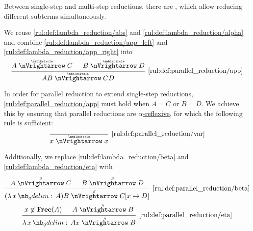 \begin{definition}\label{def:parallel_reduction}
  Between single-step and multi-step reductions, there are , which allow reducing different subterms simultaneously.

  \begin{thmenum}
     We reuse \ref{rul:def:lambda_reduction/abs} and \ref{rul:def:lambda_reduction/alpha} and combine \ref{rul:def:lambda_reduction/app_left} and \ref{rul:def:lambda_reduction/app_right} into
    \begin{equation*}\taglabel[\ensuremath{ \logic{ParApp}_{\anon} }]{rul:def:parallel_reduction/app}
      \begin{prooftree}
        \hypo{ A \ppred C }
        \hypo{ B \ppred D }
        \infer2[\ref{rul:def:parallel_reduction/app}]{ AB \ppred CD }
      \end{prooftree}
    \end{equation*}

     In order for parallel reduction to extend single-step reductions, \ref{rul:def:parallel_reduction/app} must hold when \( A = C \) or \( B = D \). We achieve this by ensuring that parallel reductions are \hyperref[def:alpha_reflexive]{\( \alpha \)-reflexive}, for which the following rule is sufficient:
    \begin{equation*}\taglabel[\ensuremath{ \logic{ParVar}_{\anon} }]{rul:def:parallel_reduction/var}
      \begin{prooftree}
        \infer0[\ref{rul:def:parallel_reduction/var}]{ x \ppred x }
      \end{prooftree}
    \end{equation*}
  \end{thmenum}

   Additionally, we replace \ref{rul:def:lambda_reduction/beta} and \ref{rul:def:lambda_reduction/eta} with
  \begin{TwoColumns}
    \begin{equation*}\taglabel[\ensuremath{ \logic{ParRed}_\beta }]{rul:def:parallel_reduction/beta}
      \begin{prooftree}
        \hypo{ A \pbred C }
        \hypo{ B \pbred D }
        \infer2[\ref{rul:def:parallel_reduction/beta}]{ (\qabs x A) B \pbred C[x \mapsto D] }.
      \end{prooftree}
    \end{equation*}
  \BeginSecondColumn
    \begin{equation*}\taglabel[\ensuremath{ \logic{ParRed}_\eta }]{rul:def:parallel_reduction/eta}
      \begin{prooftree}
        \hypo{ x \not\in \op*{Free}(A) }
        \hypo{ A \pered B }
        \infer2[\ref{rul:def:parallel_reduction/eta}]{ \qabs x A x \pered B }.
      \end{prooftree}
    \end{equation*}
  \end{TwoColumns}
\end{definition}
